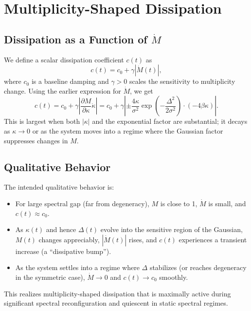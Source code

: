 \documentclass[11pt]{article}
\begin{document}
\section{Multiplicity-Shaped Dissipation}

\subsection{Dissipation as a Function of \texorpdfstring{$\dot M$}{dot M}}

We define a scalar dissipation coefficient $c(t)$ as
\begin{equation}
  c(t) = c_0 + \gamma |\dot M(t)|,
\end{equation}
where $c_0$ is a baseline damping and $\gamma>0$ scales the sensitivity to multiplicity change. Using the earlier expression for $\dot M$, we get
\begin{equation}
  c(t) = c_0 + \gamma \left|
    \frac{\partial M}{\partial \kappa} \dot\kappa
  \right|
  = c_0 + \gamma
    \left|
      \pm \frac{4\kappa}{\sigma^2}
          \exp\left(-\frac{\Delta^2}{2\sigma^2}\right)\cdot (-4\beta\kappa)
    \right|.
\end{equation}
This is largest when both $|\kappa|$ and the exponential factor are substantial; it decays as $\kappa\to 0$ or as the system moves into a regime where the Gaussian factor suppresses changes in $M$.

\subsection{Qualitative Behavior}

The intended qualitative behavior is:

\begin{itemize}
  \item For large spectral gap (far from degeneracy), $M$ is close to 1, $\dot M$ is small, and $c(t)\approx c_0$.
  \item As $\kappa(t)$ and hence $\Delta(t)$ evolve into the sensitive region of the Gaussian, $M(t)$ changes appreciably, $|\dot M(t)|$ rises, and $c(t)$ experiences a transient increase (a ``dissipative bump'').
  \item As the system settles into a regime where $\Delta$ stabilizes (or reaches degeneracy in the symmetric case), $\dot M\to 0$ and $c(t)\to c_0$ smoothly.
\end{itemize}

This realizes multiplicity-shaped dissipation that is maximally active during significant spectral reconfiguration and quiescent in static spectral regimes.
\end{document}

